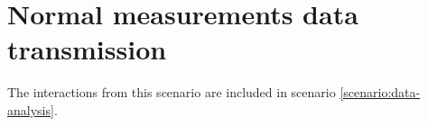 \section{Normal measurements data transmission}
\label{scenario:measurements-transmission}

\npar The interactions from this scenario are included in scenario
\ref{scenario:data-analysis}. 

